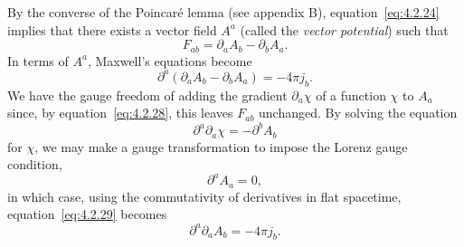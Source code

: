 By the converse of the Poincar\'e lemma (see appendix B),
equation~\eqref{eq:4.2.24} implies that there exists a vector field \(A^a\)
(called the \emph{vector potential}) such that
\begin{equation}
  F_{ab}=\partial_aA_b-\partial_bA_a .
  \tag{4.2.28}\label{eq:4.2.28}
\end{equation}
In terms of \(A^a\), Maxwell's equations become
\begin{equation}
  \partial^a(\partial_aA_b-\partial_bA_a)=-4\pi j_b .
  \tag{4.2.29}\label{eq:4.2.29}
\end{equation}
We have the gauge freedom of adding the gradient \(\partial_a\chi\) of a
function \(\chi\) to \(A_a\) since, by equation~\eqref{eq:4.2.28}, this
leaves \(F_{ab}\) unchanged. By solving the equation
\begin{equation}
  \partial^a\partial_a\chi=-\partial^bA_b
  \tag{4.2.30}\label{eq:4.2.30}
\end{equation}
for \(\chi\), we may make a gauge transformation to impose the Lorenz gauge
condition,
\begin{equation}
  \partial^aA_a=0 ,
  \tag{4.2.31}\label{eq:4.2.31}
\end{equation}
in which case, using the commutativity of derivatives in flat spacetime,
equation~\eqref{eq:4.2.29} becomes
\begin{equation}
  \partial^a\partial_aA_b=-4\pi j_b .
  \tag{4.2.32}\label{eq:4.2.32}
\end{equation}


